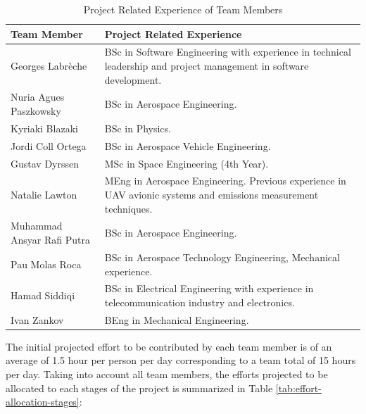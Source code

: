 \documentclass[a4paper,12pt,twoside]{article}
\begin{document}
\begin{table}[H]
\centering
\begin{tabular}{|l|m{11cm}|}
\hline
\textbf{Team Member} & \textbf{Project Related Experience} \\ \hline
Georges Labrèche & BSc in Software Engineering with experience in technical leadership and project management in software development.\\ \hline
Nuria Agues Paszkowsky & BSc in Aerospace Engineering.\\ \hline
Kyriaki Blazaki & BSc in Physics. \\ \hline
Jordi Coll Ortega &  BSc in Aerospace Vehicle Engineering. \\ \hline
Gustav Dyrssen &  MSc in Space Engineering (4th Year).\\ \hline
Natalie Lawton & MEng in Aerospace Engineering. Previous experience in UAV avionic systems and emissions measurement techniques. \\ \hline
Muhammad Ansyar Rafi Putra & BSc in Aerospace Engineering. \\ \hline
Pau Molas Roca & BSc in Aerospace Technology Engineering, Mechanical experience. \\ \hline
Hamad Siddiqi & BSc in Electrical Engineering with experience in telecommunication industry and electronics.  \\ \hline
Ivan Zankov & BEng in Mechanical Engineering.\\ \hline
\end{tabular}
\caption{Project Related Experience of Team Members}
\label{tab:team-member-experience}
\end{table}
\raggedbottom

The initial projected effort to be contributed by each team member is of an average of 1.5 hour per person per day corresponding to a team total of 15 hours per day. Taking into account all team members, the efforts projected to be allocated to each stages of the project is summarized in Table \ref{tab:effort-allocation-stages}:
\end{document}
